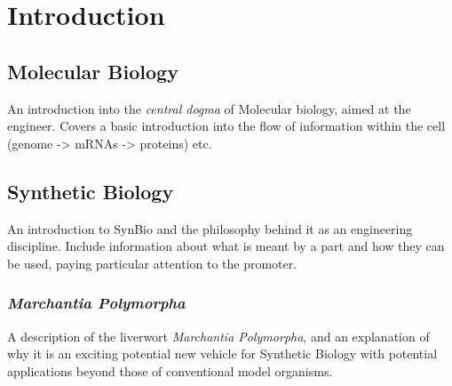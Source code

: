 
\chapter{Introduction}
\label{chap:Introduction} 

\section{Molecular Biology}
\label{seq:MolecularBiology}

An introduction into the \emph{central dogma} of Molecular biology, aimed at the
engineer. Covers a basic introduction into the flow of information within the
cell (genome -> mRNAs -> proteins) etc. 



\section{Synthetic Biology}

An introduction to SynBio and the philosophy behind it as an engineering
discipline. Include information about what is meant by a part and how they can
be used, paying particular attention to the promoter.

\subsection{\emph{Marchantia Polymorpha}}

A description of the liverwort \emph{Marchantia Polymorpha}, and an explanation
of why it is an exciting potential new vehicle for Synthetic Biology with
potential applications beyond those of conventional model organisms.

